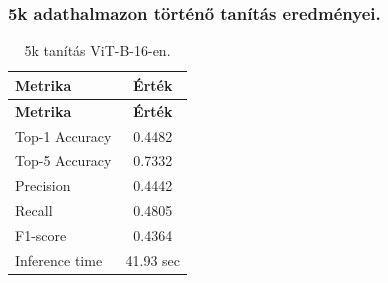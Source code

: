 \subsubsection{5k adathalmazon történő tanítás eredményei.}
  \begin{center}
    \begin{longtable}{l c}
    \caption{5k tanítás ViT-B-16-en.} \label{tab:phase03_ViT-B-16_5k} \\
    \toprule
    \textbf{Metrika} & \textbf{Érték} \\
    \midrule
    \endfirsthead
    \toprule
    \textbf{Metrika} & \textbf{Érték} \\
    \midrule
    \endhead
    Top-1 Accuracy & 0.4482 \\
    Top-5 Accuracy & 0.7332 \\
    Precision      & 0.4442 \\
    Recall         & 0.4805 \\
    F1-score       & 0.4364 \\
    Inference time & 41.93 sec \\
    \bottomrule
    \end{longtable}
  \end{center}

